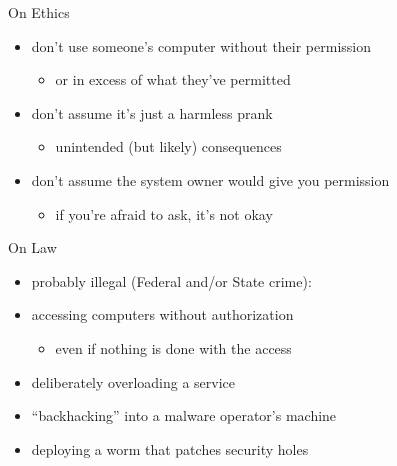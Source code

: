 
\begin{frame}{On Ethics}
    \begin{itemize}
    \item don't use someone's computer without their permission
        \begin{itemize}
        \item or in excess of what they've permitted
        \end{itemize}
    \item don't assume it's just a harmless prank
        \begin{itemize}
        \item unintended (but likely) consequences
        \end{itemize}
    \item don't assume the system owner would give you permission
        \begin{itemize}
        \item if you're afraid to ask, it's not okay
        \end{itemize}
    \end{itemize}
\end{frame}

\begin{frame}{On Law}
    \begin{itemize}
    \item probably illegal (Federal and/or State crime):
    \vspace{.5cm}
    \item accessing computers without authorization
        \begin{itemize}
        \item even if nothing is done with the access
        \end{itemize}
    \item deliberately overloading a service
    \item ``backhacking'' into a malware operator's machine
    \item deploying a worm that patches security holes
    \end{itemize}
\end{frame}

